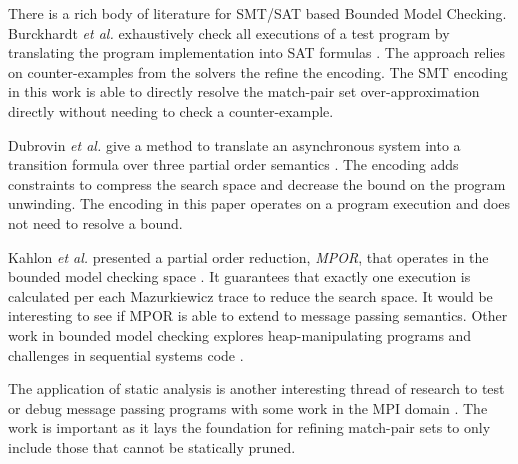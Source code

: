 \begin{comment}
Vakkalanka \emph{et al.} define POE, a dynamic partial order algorithm for
MPI programs \cite{sarvani:fm09, }.  Intuitively, the POE algorithm, as a model
checker, enumerates non-determinism in the MPI specification under
zero-buffer semantics with the goal to detect deadlock. The algorithm
is not suitable to infinite-buffer semantics as it misses
behavior. The relative efficiency, in practice, of the model checker
enumerating non-determinism versus the SMT solver is an open question
for the POE work.

Key to the POE algorithm is the notion of a
\textit{intra-happens-before-order}. The order is a partial order over
MPI events that generalizes to any control flow path through the
program.  The SMT encoding in this paper builds the happens-before relation
for a given control flow path and does not reason directly over all
control flow paths in the program. A secondary analysis is needed to
find program inputs sufficient to enumerate all reachable control flow
paths in order to apply the SMT encoding to complete program
verification.
\end{comment}

There is a rich body of literature for SMT/SAT based Bounded Model
Checking. Burckhardt \emph{et al.} exhaustively check all executions of a
test program by translating the program implementation into SAT
formulas \cite{burckhardt:pldi07}. The approach relies on
counter-examples from the solvers the refine the encoding. The SMT
encoding in this work is able to directly resolve the match-pair set
over-approximation directly without needing to check a
counter-example.

Dubrovin \emph{et al.} give a method to translate an asynchronous system into
a transition formula over three partial order semantics
\cite{heljanko:scp}. The encoding adds constraints to compress the
search space and decrease the bound on the program unwinding. The
encoding in this paper operates on a program execution and does not
need to resolve a bound.

Kahlon \emph{et al.} presented a partial order reduction, \textit{MPOR}, that
operates in the bounded model checking space \cite{kahlon:cav09}.  It
guarantees that exactly one execution is calculated per each
Mazurkiewicz trace to reduce the search space. It would be interesting
to see if MPOR is able to extend to message passing semantics. Other
work in bounded model checking explores heap-manipulating programs and
challenges in sequential systems code \cite{lahiri:popl08, lahiri:cav11}.

The application of static analysis is another interesting thread of
research to test or debug message passing programs with some work in
the MPI domain \cite{zhang:ppopp07, greg:cgo09, gray:lctes11}. The
work is important as it lays the foundation for refining match-pair
sets to only include those that cannot be statically pruned.
